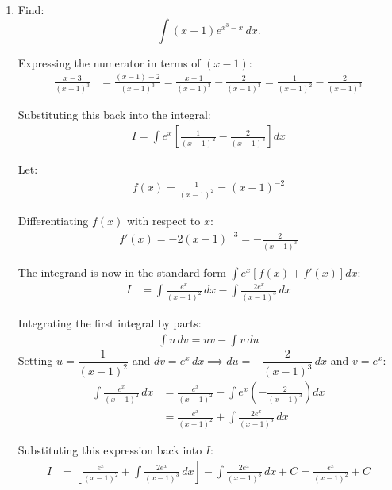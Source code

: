 \begin{enumerate}[label=\thesubsection.\arabic*, ref=\thesubsection.\theenumi]
\begin{align*}
	I &= \int \left(\sec x \tan x + \csc x \cot x\right)\,dx = \int \sec x \tan x\,dx + \int \csc x \cot x\,dx \\
	I &= \sec x - \csc x + C
\end{align*}



\item Find:
\[
\int (x-1)e^{x^3-x}\,dx.
\]

\solution
Expressing the numerator in terms of $(x - 1)$:
\begin{align*}
	\frac{x - 3}{(x - 1)^3} &= \frac{(x - 1) - 2}{(x - 1)^3} = \frac{x - 1}{(x - 1)^3} - \frac{2}{(x - 1)^3} = \frac{1}{(x - 1)^2} - \frac{2}{(x - 1)^3}
\end{align*}

Substituting this back into the integral:
\begin{align*}
	I = \int e^x \left[ \frac{1}{(x - 1)^2} - \frac{2}{(x - 1)^3} \right] dx
\end{align*}

Let:
\begin{align*}
	f(x) = \frac{1}{(x - 1)^2} = (x - 1)^{-2}
\end{align*}

Differentiating $f(x)$ with respect to $x$:
\begin{align*}
	f'(x) = -2(x - 1)^{-3} = -\frac{2}{(x - 1)^3}
\end{align*}

The integrand is now in the standard form $\displaystyle\int e^x \left[ f(x) + f'(x) \right] dx$:
\begin{align*}
	I &= \int \frac{e^x}{(x - 1)^2}\,dx - \int \frac{2e^x}{(x - 1)^3}\,dx
\end{align*}

Integrating the first integral by parts:
\begin{align*}
	\int u\,dv = u v - \int v\,du
\end{align*}
Setting $u = \dfrac{1}{(x - 1)^2}$ and $dv = e^x\,dx \implies du = -\dfrac{2}{(x - 1)^3}\,dx$ and $v = e^x$:
\begin{align*}
	\int \frac{e^x}{(x - 1)^2}\,dx &= \frac{e^x}{(x - 1)^2} - \int e^x \left( -\frac{2}{(x - 1)^3} \right) dx \\
	&= \frac{e^x}{(x - 1)^2} + \int \frac{2e^x}{(x - 1)^3}\,dx
\end{align*}

Substituting this expression back into $I$:
\begin{align*}
	I &= \left[ \frac{e^x}{(x - 1)^2} + \int \frac{2e^x}{(x - 1)^3}\,dx \right] - \int \frac{2e^x}{(x - 1)^3}\,dx + C = \frac{e^x}{(x - 1)^2} + C
\end{align*}


\end{enumerate}
